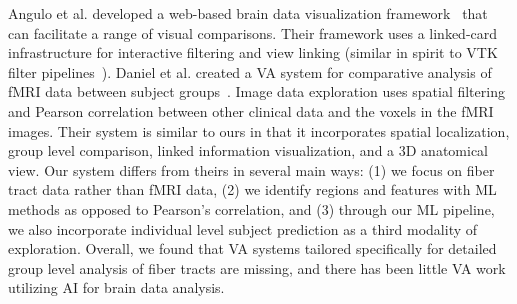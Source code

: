 Angulo et al. developed %
a web-based brain data visualization framework~\cite{angulo2016multi} that can facilitate a range of visual comparisons. Their framework uses a linked-card infrastructure for interactive filtering and view linking (similar in spirit to VTK filter pipelines~\cite{schroeder2002visualization}).
Daniel et al. created a VA system for comparative analysis of fMRI data between subject groups~\cite{bm.20191232}. Image data exploration uses spatial filtering and Pearson correlation between other clinical data and the voxels in the fMRI images. Their system is similar to ours in that it incorporates spatial localization, group level comparison, linked information visualization, and a 3D anatomical view. Our system differs from theirs in several main ways: (1) we focus on fiber tract data rather than fMRI data, (2) we identify regions and features with ML methods as opposed to Pearson's correlation, and (3) through our ML pipeline, we also incorporate individual level subject prediction as a third modality of exploration.  Overall, we found that VA systems tailored specifically for detailed group level analysis of fiber tracts are missing, and there has been little VA work utilizing AI for brain data analysis.




